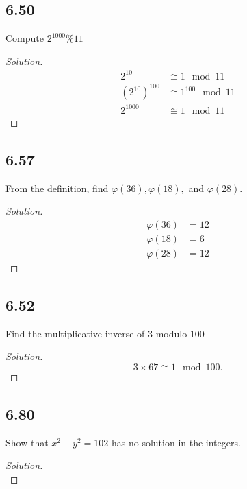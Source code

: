 \documentclass[]{article}
\let\phi\varphi
\newcommand\<{\langle}
\renewcommand\>{\rangle}
\newenvironment{solution}
{
	\begin{proof}[Solution] \text{ }
		\\
	}
	{
	\end{proof}
}
\begin{document}
\subsection*{6.50} Compute $2^{1000} \% 11$
\begin{solution}
	\begin{align*}
		2^{10} &\cong 1 \mod 11 \\
		\left(2^{10}\right)^{100} &\cong 1^{100} \mod 11 \\
		2^{1000} &\cong 1 \mod 11
	\end{align*}
\end{solution}

\subsection*{6.57} From the definition, find $\phi(36), \phi(18),$ and $\phi(28)$.
\begin{solution}
	\begin{align*}
		\phi(36) &= 12 \\
		\phi(18) &= 6 \\
		\phi(28) &= 12
	\end{align*}
\end{solution}

\subsection*{6.52} Find the multiplicative inverse of 3 modulo 100
\begin{solution}
	$$
		3 \times 67 \cong 1 \mod 100.
	$$
\end{solution}

\subsection*{6.80} Show that $x^2 - y^2 = 102$ has no solution in the integers.
\begin{solution}
	   
\end{solution}
\end{document}
